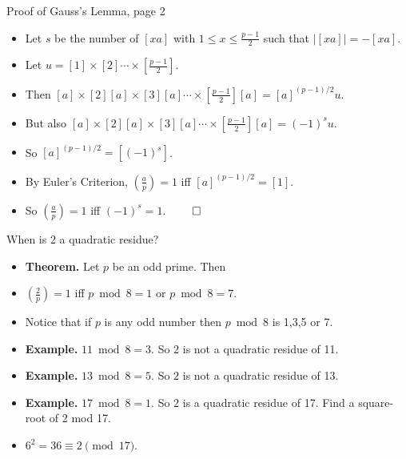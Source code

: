 \documentclass{beamer}
\begin{document}
\begin{frame}{Proof of Gauss's Lemma, page 2}

\begin{itemize}
  \item Let $s$ be the number of $[xa]$ with $1\leq x \leq \frac{p-1}{2}$ such that $|[xa]| = - [xa]$.
  \item Let $u=[1]\times[2]\cdots \times [\frac{p-1}{2}]$.
  \item Then $[a]\times[2][a]\times[3][a]\cdots \times [\frac{p-1}{2}][a] = [a]^{(p-1)/2} u$.
  \item But also $[a]\times[2][a]\times[3][a]\cdots \times [\frac{p-1}{2}][a] = (-1)^s u$.
  \item So $[a]^{(p-1)/2}=[(-1)^s]$.
  \item By Euler's Criterion, $(\frac{a}{p}) = 1$ iff $[a]^{(p-1)/2} = [1]$.
  \item So $(\frac{a}{p}) = 1$ iff $(-1)^s = 1$. $\qed$
\end{itemize}

\end{frame}

\begin{frame}{When is 2 a quadratic residue?}

\begin{itemize}
  \item \textbf{Theorem.}  Let $p$ be an odd prime. Then
  \item $(\frac{2}{p}) = 1$ iff $p\bmod 8 = 1$ or $p\bmod 8 = 7$.
  \item Notice that if $p$ is any odd number then $p \bmod 8$ is 1,3,5 or 7.
  \item \textbf{Example.} $11\bmod 8 = 3$. So $2$ is not a quadratic residue of 11.
  \item \textbf{Example.} $13\bmod 8 = 5$. So $2$ is not a quadratic residue of 13.
  \item \textbf{Example.} $17\bmod 8 = 1$. So $2$ is a quadratic residue of 17. Find a square-root of 2 mod 17.
  \item $6^2 = 36 \equiv 2 \pmod {17}$.
\end{itemize}

\end{frame}
\end{document}
